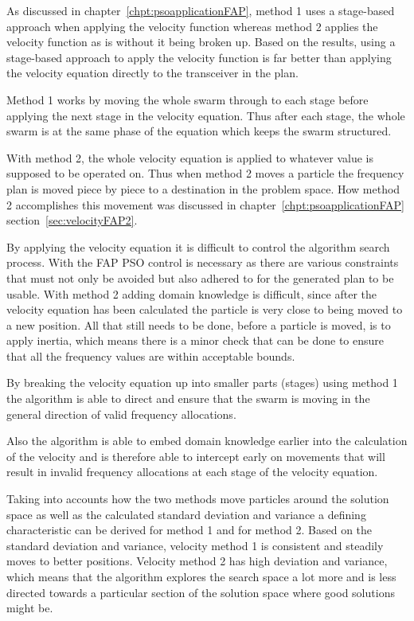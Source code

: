 As discussed in chapter~\ref{chpt:psoapplicationFAP}, method 1 uses a stage-based approach when applying the velocity function whereas method 2 applies the velocity function as is without it being broken up. Based on the results, using a stage-based approach to apply the velocity function is far better than applying the velocity equation directly to the transceiver in the plan.

Method 1 works by moving the whole swarm through to each stage before applying the next stage in the velocity equation. Thus after each stage, the whole swarm is at the same phase of the equation which keeps the swarm structured.

With method 2, the whole velocity equation is applied to whatever value is supposed to be operated on. Thus when method 2 moves a particle the frequency plan is moved piece by piece to a destination in the problem space. How method 2 accomplishes this movement was discussed in chapter~\ref{chpt:psoapplicationFAP} section~\ref{sec:velocityFAP2}.

By applying the velocity equation it is difficult to control the algorithm search process. With the FAP PSO control is necessary as there are various constraints that must not only be avoided but also adhered to for the generated plan to be usable. With method 2 adding domain knowledge is difficult, since after the velocity equation has been calculated the particle is very close to being moved to a new position. All that still needs to be done, before a particle is moved, is to apply inertia, which means there is a minor check that can be done to ensure that all the frequency values are within acceptable bounds.

By breaking the velocity equation up into smaller parts (stages) using method 1 the algorithm is able to direct and ensure that the swarm is moving in the general direction of valid frequency allocations.

Also the algorithm is able to embed domain knowledge earlier into the calculation of the velocity and is therefore able to intercept early on movements that will result in invalid frequency allocations at each stage of the velocity equation.

Taking into accounts how the two methods move particles around the solution space as well as the calculated standard deviation and variance a defining characteristic can be derived for method 1 and for method 2. Based on the standard deviation and variance, velocity method 1 is consistent and steadily moves to better positions. Velocity method 2 has high deviation and variance, which means that the algorithm explores the search space a lot more and is less directed towards a particular section of the solution space where good solutions might be. 

